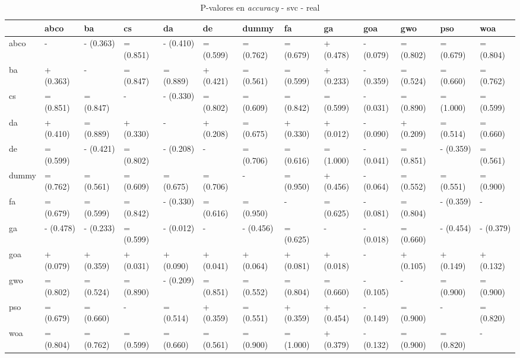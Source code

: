 \begin{table}
    \centering
    \begin{adjustbox}{width=\linewidth}
        \begin{tabular}{lllllllllllll}
            \toprule
            {}    & abco      & ba        & cs        & da        & de        & dummy     & fa        & ga        & goa       & gwo       & pso       & woa       \\
            \midrule
            abco  & -         & - (0.363) & = (0.851) & - (0.410) & = (0.599) & = (0.762) & = (0.679) & + (0.478) & - (0.079) & = (0.802) & = (0.679) & = (0.804) \\
            ba    & + (0.363) & -         & = (0.847) & = (0.889) & + (0.421) & = (0.561) & = (0.599) & + (0.233) & - (0.359) & = (0.524) & = (0.660) & = (0.762) \\
            cs    & = (0.851) & = (0.847) & -         & - (0.330) & = (0.802) & = (0.609) & = (0.842) & = (0.599) & - (0.031) & = (0.890) & = (1.000) & = (0.599) \\
            da    & + (0.410) & = (0.889) & + (0.330) & -         & + (0.208) & = (0.675) & + (0.330) & + (0.012) & - (0.090) & + (0.209) & = (0.514) & = (0.660) \\
            de    & = (0.599) & - (0.421) & = (0.802) & - (0.208) & -         & = (0.706) & = (0.616) & = (1.000) & - (0.041) & = (0.851) & - (0.359) & = (0.561) \\
            dummy & = (0.762) & = (0.561) & = (0.609) & = (0.675) & = (0.706) & -         & = (0.950) & + (0.456) & - (0.064) & = (0.552) & = (0.551) & = (0.900) \\
            fa    & = (0.679) & = (0.599) & = (0.842) & - (0.330) & = (0.616) & = (0.950) & -         & = (0.625) & - (0.081) & = (0.804) & - (0.359) & -         \\
            ga    & - (0.478) & - (0.233) & = (0.599) & - (0.012) & -         & - (0.456) & = (0.625) & -         & - (0.018) & = (0.660) & - (0.454) & - (0.379) \\
            goa   & + (0.079) & + (0.359) & + (0.031) & + (0.090) & + (0.041) & + (0.064) & + (0.081) & + (0.018) & -         & + (0.105) & + (0.149) & + (0.132) \\
            gwo   & = (0.802) & = (0.524) & = (0.890) & - (0.209) & = (0.851) & = (0.552) & = (0.804) & = (0.660) & - (0.105) & -         & = (0.900) & = (0.900) \\
            pso   & = (0.679) & = (0.660) & -         & = (0.514) & + (0.359) & = (0.551) & + (0.359) & + (0.454) & - (0.149) & = (0.900) & -         & = (0.820) \\
            woa   & = (0.804) & = (0.762) & = (0.599) & = (0.660) & = (0.561) & = (0.900) & = (1.000) & + (0.379) & - (0.132) & = (0.900) & = (0.820) & -         \\
            \bottomrule
        \end{tabular}
    \end{adjustbox}
    \caption{P-valores en \textit{accuracy} - svc - real}
    \label{tab:p-values_accuracy_real_svc}
\end{table}

